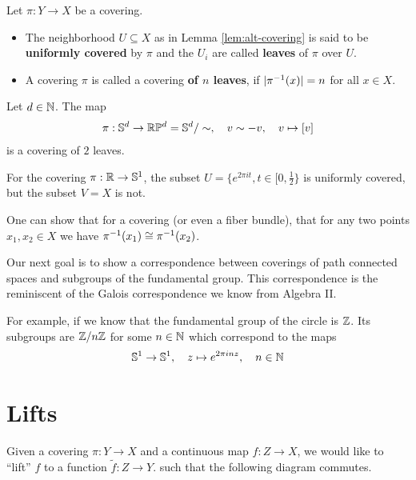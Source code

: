 \begin{dfn}[]
Let $\pi: Y \to  X$ be a covering.
\begin{itemize}
  \item The neighborhood $U \subseteq X$ as in Lemma \ref{lem:alt-covering} is said to be \textbf{uniformly covered} by $\pi$ and the $U_i$ are called \textbf{leaves} of $\pi$ over $U$.
  \item A covering $\pi$ is called a covering \textbf{of $n$ leaves}, if $\vert\pi^{-1}(x)\vert = n$ for all $x \in X$.
\end{itemize}
\end{dfn}

\begin{ex}[]
Let $d \in \mathbb{N}$. The map
\begin{align*}
  \pi: \mathbb{S}^{d} \to \mathbb{R}\mathbb{P}^{d} = \mathbb{S}^{d}/\sim, \quad v \sim - v, \quad v \mapsto [v]
\end{align*}
is a covering of $2$ leaves.

For the covering $\pi: \mathbb{R} \to \mathbb{S}^{1}$, the subset $U = \{e^{2 \pi i t}, t \in [0,\frac{1}{2}\}$ is uniformly covered, but the subset $V = X$ is not.
\end{ex}

One can show that for a covering (or even a fiber bundle), that for any two points $x_1,x_2 \in X$ we have $\pi^{-1}(x_1) \cong \pi^{-1}(x_2)$.


Our next goal is to show a correspondence between coverings of path connected spaces and subgroups of the fundamental group.
This correspondence is the reminiscent of the Galois correspondence we know from Algebra II. 

For example, if we know that the fundamental group of the circle is $\mathbb{Z}$.
Its subgroups are $\mathbb{Z}/n\mathbb{Z}$ for some $n\in \mathbb{N}$ which correspond to the maps
\begin{align*}
  \mathbb{S}^{1} \to  \mathbb{S}^{1}, \quad z \mapsto  e^{2 \pi i n z}, \quad n \in \mathbb{N}
\end{align*}

\section{Lifts}
Given a covering $\pi: Y \to X$ and a continuous map $f: Z \to  X$, we would like to ``lift'' $f$ to a function $\tilde{f}: Z \to  Y$. such that the following diagram commutes.
\begin{center}
\end{center}

